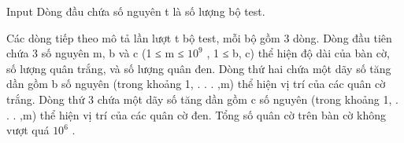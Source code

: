 Input
Dòng đầu chứa số nguyên t là số lượng bộ test.  

   Các dòng tiếp theo mô tả lần lượt t bộ test, mỗi bộ gồm 3 dòng. Dòng đầu tiên chứa 3 số nguyên m, b và c (1 ≤ m ≤ $10^{9}$   , 1 ≤ b, c) thể hiện độ dài của bàn cờ, số lượng quân trắng, và số lượng quân đen. Dòng thứ hai chứa một dãy số tăng dần gồm b số nguyên (trong khoảng 1, . . . ,m) thể hiện vị trí của các quân cờ trắng. Dòng thứ 3 chứa một dãy số tăng dần gồm c số nguyên (trong khoảng 1, . . . ,m) thể hiện vị trí của các quân cờ đen. Tổng số quân cờ trên bàn cờ không vượt quá $10^{6}$   .